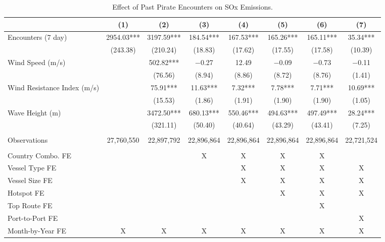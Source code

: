 \begin{table}
\centering
\caption{Effect of Past Pirate Encounters on SOx Emissions. \label{tab:spec-sox-table}}
\centering
\begin{adjustbox}{width = .9\textwidth}
\begin{threeparttable}
\begin{tabular}[t]{lccccccc}
\toprule
  & (1) & (2) & (3) & (4) & (5) & (6) & (7)\\
\midrule
Encounters (7 day) & \num{2954.03}*** & \num{3197.59}*** & \num{184.54}*** & \num{167.53}*** & \num{165.26}*** & \num{165.11}*** & \num{35.34}***\\
 & (\num{243.38}) & (\num{210.24}) & (\num{18.83}) & (\num{17.62}) & (\num{17.55}) & (\num{17.58}) & (\num{10.39})\\
Wind Speed (m/s) &  & \num{502.82}*** & \num{-0.27} & \num{12.49} & \num{-0.09} & \num{-0.73} & \num{-0.11}\\
 &  & (\num{76.56}) & (\num{8.94}) & (\num{8.86}) & (\num{8.72}) & (\num{8.76}) & (\num{1.41})\\
Wind Resistance Index (m/s) &  & \num{75.91}*** & \num{11.63}*** & \num{7.32}*** & \num{7.78}*** & \num{7.71}*** & \num{10.69}***\\
 &  & (\num{15.53}) & (\num{1.86}) & (\num{1.91}) & (\num{1.90}) & (\num{1.90}) & (\num{1.05})\\
Wave Height (m) &  & \num{3472.50}*** & \num{680.13}*** & \num{550.46}*** & \num{494.63}*** & \num{497.49}*** & \num{28.24}***\\
 &  & (\num{321.11}) & (\num{50.40}) & (\num{40.64}) & (\num{43.29}) & (\num{43.41}) & (\num{7.25})\\
 &  &  &  &  &  &  & \\
Observations & 27,760,550 & 22,897,792 & 22,896,864 & 22,896,864 & 22,896,864 & 22,896,864 & 22,721,524\\
 &  &  &  &  &  &  & \\
Country Combo. FE &  &  & X & X & X & X & \\
Vessel Type FE &  &  &  & X & X & X & X\\
Vessel Size FE &  &  &  & X & X & X & X\\
Hotspot FE &  &  &  &  & X & X & X\\
Top Route FE &  &  &  &  &  & X & \\
Port-to-Port FE &  &  &  &  &  &  & X\\
Month-by-Year FE & X & X & X & X & X & X & X\\
\bottomrule
\end{tabular}

\end{threeparttable}
\end{adjustbox}
\end{table}
